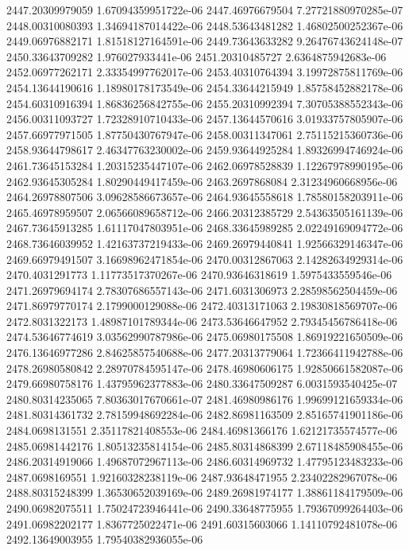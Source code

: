 {2447.20309979059 1.67094359951722e-06
2447.46976679504 7.27721880970285e-07
2448.00310080393 1.34694187014422e-06
2448.53643481282 1.46802500252367e-06
2449.06976882171 1.81518127164591e-06
2449.73643633282 9.26476743624148e-07
2450.33643709282 1.976027933441e-06
2451.20310485727 2.6364875942683e-06
2452.06977262171 2.33354997762017e-06
2453.40310764394 3.19972875811769e-06
2454.13644190616 1.18980178173549e-06
2454.33644215949 1.85758452882178e-06
2454.60310916394 1.86836256842755e-06
2455.20310992394 7.30705388552343e-06
2456.00311093727 1.72328910710433e-06
2457.13644570616 3.01933757805907e-06
2457.66977971505 1.87750430767947e-06
2458.00311347061 2.75115215360736e-06
2458.93644798617 2.46347763230002e-06
2459.93644925284 1.89326994746924e-06
2461.73645153284 1.20315235447107e-06
2462.06978528839 1.12267978990195e-06
2462.93645305284 1.80290449417459e-06
2463.2697868084 2.31234960668956e-06
2464.26978807506 3.09628586673657e-06
2464.93645558618 1.78580158203911e-06
2465.46978959507 2.06566089658712e-06
2466.20312385729 2.54363505161139e-06
2467.73645913285 1.61117047803951e-06
2468.33645989285 2.02249169094772e-06
2468.73646039952 1.42163737219433e-06
2469.26979440841 1.92566329146347e-06
2469.66979491507 3.16698962471854e-06
2470.00312867063 2.14282634929314e-06
2470.4031291773 1.11773517370267e-06
2470.93646318619 1.5975433559546e-06
2471.26979694174 2.78307686557143e-06
2471.6031306973 2.28598562504459e-06
2471.86979770174 2.1799000129088e-06
2472.40313171063 2.19830818569707e-06
2472.8031322173 1.48987101789344e-06
2473.53646647952 2.79345456786418e-06
2474.53646774619 3.03562990787986e-06
2475.06980175508 1.86919221650509e-06
2476.13646977286 2.84625857540688e-06
2477.20313779064 1.72366411942788e-06
2478.26980580842 2.28970784595147e-06
2478.46980606175 1.92850661582087e-06
2479.66980758176 1.43795962377883e-06
2480.33647509287 6.0031593540425e-07
2480.80314235065 7.80363017670661e-07
2481.46980986176 1.99699121659334e-06
2481.80314361732 2.78159948692284e-06
2482.86981163509 2.85165741901186e-06
2484.0698131551 2.35117821408553e-06
2484.46981366176 1.62121735574577e-06
2485.06981442176 1.80513235814154e-06
2485.80314868399 2.67118485908455e-06
2486.20314919066 1.49687072967113e-06
2486.60314969732 1.47795123483233e-06
2487.0698169551 1.92160328238119e-06
2487.93648471955 2.23402282967078e-06
2488.80315248399 1.36530652039169e-06
2489.26981974177 1.38861184179509e-06
2490.06982075511 1.75024723946441e-06
2490.33648775955 1.79367099264403e-06
2491.06982202177 1.8367725022471e-06
2491.60315603066 1.14110792481078e-06
2492.13649003955 1.79540382936055e-06
}
